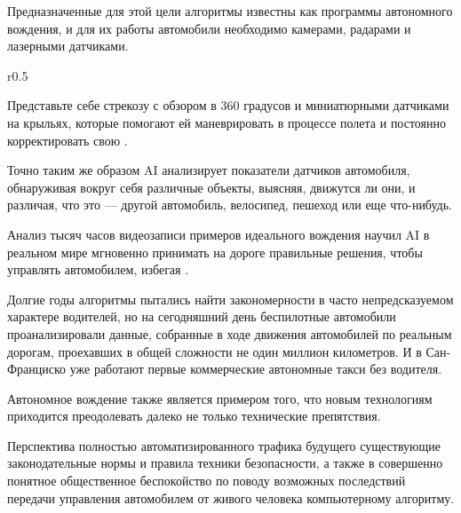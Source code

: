 Предназначенные для этой цели алгоритмы известны как программы автономного вождения, и для их работы автомобили необходимо  камерами, радарами и лазерными датчиками.

\begin{wrapfigure}{r}{0.5\textwidth}
    \begin{fancyquotes}
        Представьте себе стрекозу с обзором в 360 градусов и миниатюрными датчиками на крыльях, которые помогают ей маневрировать в процессе полета и постоянно корректировать свою .
    \end{fancyquotes}
\end{wrapfigure}
Точно таким же образом AI анализирует показатели датчиков автомобиля, обнаруживая вокруг себя различные объекты, выясняя, движутся ли они, и различая, что это — другой автомобиль, велосипед, пешеход или еще что-нибудь.

Анализ тысяч часов видеозаписи примеров идеального вождения научил AI в реальном мире мгновенно принимать на дороге правильные решения, чтобы управлять автомобилем, избегая .

Долгие годы алгоритмы пытались найти закономерности в часто непредсказуемом характере водителей, но на сегодняшний день беспилотные автомобили проанализировали данные, собранные в ходе движения автомобилей по реальным дорогам, проехавших в общей сложности не один миллион километров. И в Сан-Франциско уже работают первые коммерческие автономные такси без водителя.

Автономное вождение также является  примером того, что новым технологиям приходится преодолевать далеко не только технические препятствия.

Перспектива полностью автоматизированного трафика будущего  существующие законодательные нормы и правила техники безопасности, а также в совершенно понятное общественное беспокойство по поводу возможных последствий передачи управления автомобилем от живого человека компьютерному алгоритму.

